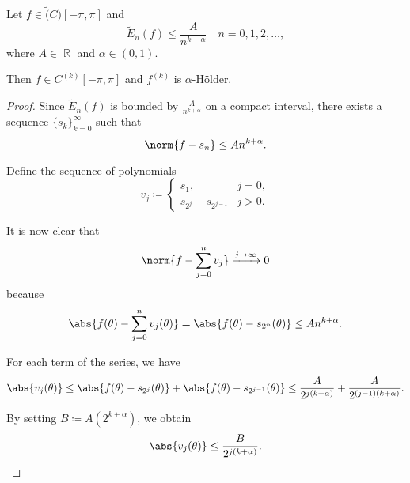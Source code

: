 \begin{theorem}\label{thm:bernsteins_trigonometric_theorem}\mcite\cite[55]{Николов2020}
  Let \( f \in \tilde(C)[-\pi, \pi] \) and
  \begin{equation*}
    \tilde{E}_n(f) \leq \frac A {n^{k+\alpha}} \quad n = 0, 1, 2, \ldots,
  \end{equation*}
  where \( A \in \BbbR \) and \( \alpha \in (0, 1) \).

  Then \( f \in C^{(k)}[-\pi, \pi] \) and \( f^{(k)} \) is \( \alpha \)-H\"older.
\end{theorem}
\begin{proof}
  Since \( \tilde{E}_n(f) \) is bounded by \( \frac A {n^{k+\alpha}} \) on a compact interval, there exists a sequence \( \{ s_k \}_{k=0}^\infty \) such that
  \begin{equation*}
    \norm{f - s_n} \leq A {n^{k+\alpha}}.
  \end{equation*}

  Define the sequence of polynomials
  \begin{equation*}
    v_j \coloneqq \begin{cases}
      s_1,                  &j = 0, \\
      s_{2^j} - s_{2^{j-1}} &j > 0.
    \end{cases}
  \end{equation*}

  It is now clear that
  \begin{equation*}
    \norm{f - \sum_{j=0}^n v_j} \xrightarrow[]{j \to \infty} 0
  \end{equation*}
  because
  \begin{equation*}
    \abs{f(\theta) - \sum_{j=0}^n v_j (\theta)}
    =
    \abs{f(\theta) - s_{2^n}(\theta)}
    \leq
    A {n^{k+\alpha}}.
  \end{equation*}

  For each term of the series, we have
  \begin{equation*}
    \abs{v_j(\theta)}
    \leq
    \abs{f(\theta) - s_{2^j}(\theta)} + \abs{f(\theta) - s_{2^{j-1}}(\theta)}
    \leq
    \frac A {2^{j(k + \alpha)}} + \frac A {2^{(j - 1) (k + \alpha)}}.
  \end{equation*}

  By setting \( B \coloneqq A (2^{k + \alpha}) \), we obtain
  \begin{equation*}
    \abs{v_j(\theta)} \leq \frac B {2^{j(k + \alpha)}}.
  \end{equation*}


\end{proof}

